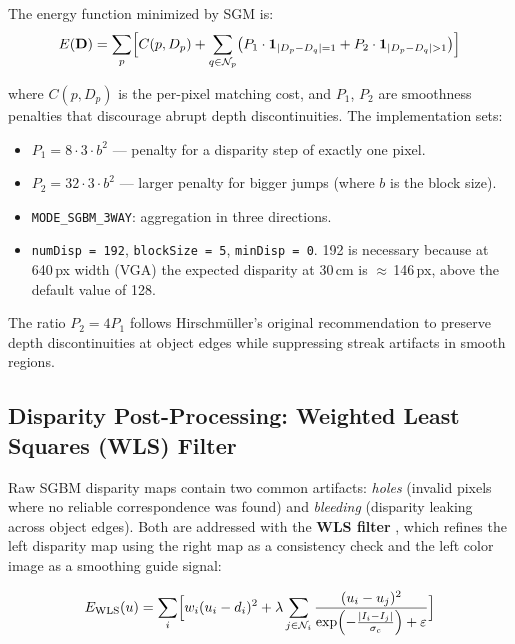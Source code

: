 \documentclass[12pt, a4paper]{article}
\begin{document}
The energy function minimized by SGM is:
\begin{equation}
E(\mathbf{D}) = \sum_{p} \Bigl[
  C(p, D_p)
  + \sum_{q \in \mathcal{N}_p} \bigl(P_1 \cdot \mathbf{1}_{|D_p - D_q|=1}
    + P_2 \cdot \mathbf{1}_{|D_p - D_q|>1}\bigr)
\Bigr]
\end{equation}

where $C(p, D_p)$ is the per-pixel matching cost, and $P_1$, $P_2$ are smoothness
penalties that discourage abrupt depth discontinuities. The implementation sets:

\begin{itemize}[leftmargin=2em]
  \item $P_1 = 8 \cdot 3 \cdot b^2$ --- penalty for a disparity step of exactly one pixel.
  \item $P_2 = 32 \cdot 3 \cdot b^2$ --- larger penalty for bigger jumps
        (where $b$ is the block size).
  \item \texttt{MODE\_SGBM\_3WAY}: aggregation in three directions.
  \item \texttt{numDisp = 192}, \texttt{blockSize = 5}, \texttt{minDisp = 0}.
        192 is necessary because at 640\,px width (VGA) the expected disparity at
        30\,cm is $\approx$\,146\,px, above the default value of 128.
\end{itemize}

The ratio $P_2 = 4 P_1$ follows Hirschm\"uller's original recommendation to preserve
depth discontinuities at object edges while suppressing streak artifacts in smooth regions.

\subsection{Disparity Post-Processing: Weighted Least Squares (WLS) Filter}

Raw SGBM disparity maps contain two common artifacts: \textit{holes} (invalid pixels
where no reliable correspondence was found) and \textit{bleeding} (disparity leaking
across object edges). Both are addressed with the \textbf{WLS filter}
\cite{min2014fast}, which refines the left disparity map using the right map as a
consistency check and the left color image as a smoothing guide signal:

\begin{equation}
E_{\text{WLS}}(u) = \sum_i \Bigl[
  w_i (u_i - d_i)^2
  + \lambda \sum_{j \in \mathcal{N}_i} \frac{(u_i - u_j)^2}
    {\exp\!\left(-\frac{|I_i - I_j|}{\sigma_c}\right) + \varepsilon}
\Bigr]
\end{equation}
\end{document}
